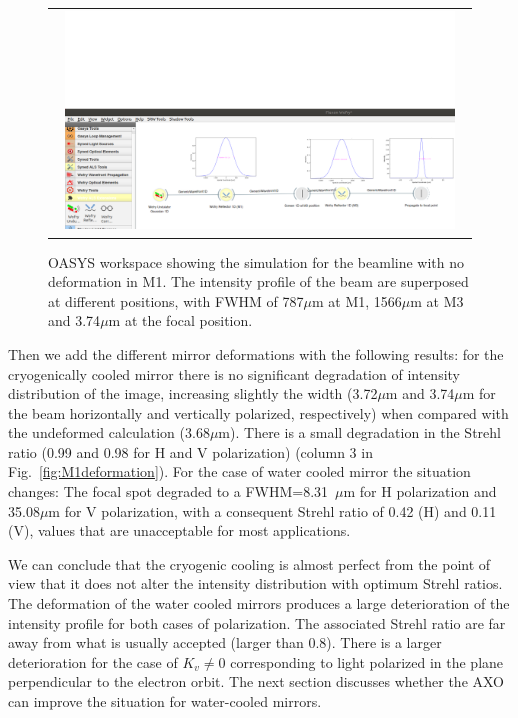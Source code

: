 \documentclass[]{spie}  %
\begin{document}
\begin{figure} [ht]
\begin{center}
\begin{tabular}{c} 
\includegraphics[trim=0 0 5 200,clip,width=0.95\textwidth]{figures/wofrynodeformation.png}

\end{tabular}
\end{center}
\caption[example] 
{ \label{fig:nodeformation} 
OASYS workspace showing the simulation for the beamline with no deformation in M1. The intensity profile of the beam are superposed at different positions, with FWHM of 787$\mu$m at M1, 1566$\mu$m at M3 and 3.74$\mu$m at the focal position.  }
\end{figure} 

Then we add the different mirror deformations with the following results: for the cryogenically cooled mirror there is no significant degradation of intensity distribution of the image, increasing slightly the width (3.72$\mu$m and 3.74$\mu$m for the beam horizontally and vertically polarized, respectively) when compared with the undeformed calculation (3.68$\mu$m). There is a small degradation in the Strehl ratio (0.99 and 0.98 for H and V polarization) (column 3 in Fig.~\ref{fig:M1deformation}). For the case of water cooled mirror the situation changes: The focal spot degraded to a FWHM=8.31~$\mu$m for H polarization and 35.08$\mu$m for V polarization, with a consequent Strehl ratio of 0.42 (H) and 0.11 (V), values that are unacceptable for most applications. 

We can conclude that the cryogenic cooling is almost perfect from the point of view that it does not alter the intensity distribution with optimum Strehl ratios. The deformation of the water cooled mirrors produces a large deterioration of the intensity profile for both cases of polarization. The associated Strehl ratio are far away from what is usually accepted (larger than 0.8). There is a larger deterioration for the case of $K_v\ne 0$ corresponding to light polarized in the plane perpendicular to the electron orbit. The next section discusses whether the AXO can improve the situation for water-cooled mirrors.    
\end{document}
